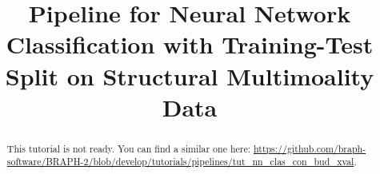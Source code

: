 \documentclass[justified]{tufte-handout}
\title[Classification Training-Test Split Structural Multimoality Data]{Pipeline for Neural Network Classification with Training-Test Split on Structural Multimoality Data}
\begin{document}
\maketitle

\begin{abstract}
\noindent
This tutorial is not ready. You can find a similar one here: \url{https://github.com/braph-software/BRAPH-2/blob/develop/tutorials/pipelines/tut_nn_clas_con_bud_xval}.
\end{abstract}
\end{document}
